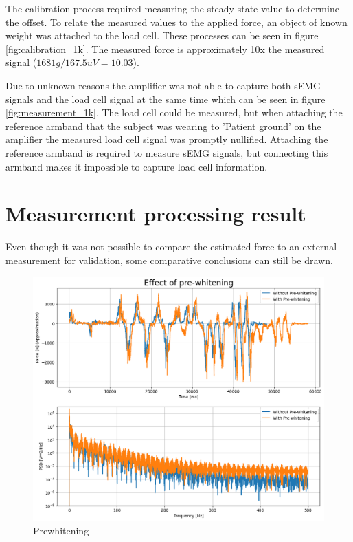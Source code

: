 The calibration process required measuring the steady-state value to determine the offset. To relate the measured values to the applied force, an object of known weight was attached to the load cell. These processes can be seen in figure \ref{fig:calibration_1k}. The measured force is approximately 10x the measured signal ($1681g / 167.5 uV = 10.03$).

Due to unknown reasons the amplifier was not able to capture both sEMG signals and the load cell signal at the same time which can be seen in figure \ref{fig:measurement_1k}. The load cell could be measured, but when attaching the reference armband that the subject was wearing to 'Patient ground' on the amplifier the measured load cell signal was promptly nullified. Attaching the reference armband is required to measure sEMG signals, but connecting this armband makes it impossible to capture load cell information.

\section{Measurement processing result}
Even though it was not possible to compare the estimated force to an external measurement for validation, some comparative conclusions can still be drawn.


\begin{figure}[h!t]
	\begin{center}
		\includegraphics[width=0.8\columnwidth]{images/measurement_prewhitening.png}
	\end{center}
	\caption{Prewhitening}
	\label{fig:result_prewhitening}
\end{figure}

